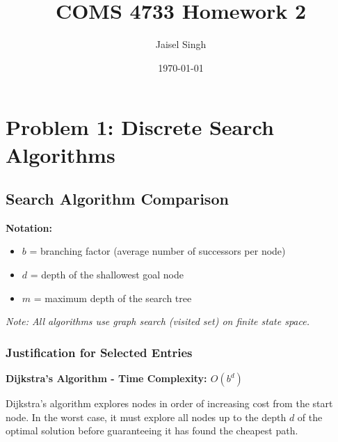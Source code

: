 \documentclass[11pt]{article}
\title{COMS 4733 Homework 2}
\author{Jaisel Singh}
\date{\today}
\begin{document}
\maketitle
\section{Problem 1: Discrete Search Algorithms}
\subsection{Search Algorithm Comparison}
\noindent\textbf{Notation:}
\begin{itemize}
\item $b$ = branching factor (average number of successors per node)
\item $d$ = depth of the shallowest goal node
\item $m$ = maximum depth of the search tree
\end{itemize}
\noindent\textit{Note: All algorithms use graph search (visited set) on finite state space.}

\begin{table}[h]
    \centering
    \caption{Comparison of search algorithms}
    \label{tab:search_comparison}
    \end{table}
\subsubsection*{Justification for Selected Entries}

\textbf{Dijkstra's Algorithm - Time Complexity: $O(b^d)$}

Dijkstra's algorithm explores nodes in order of increasing cost from the start node. In the worst case, it must explore all nodes up to the depth $d$ of the optimal solution before guaranteeing it has found the cheapest path.
\end{document}
